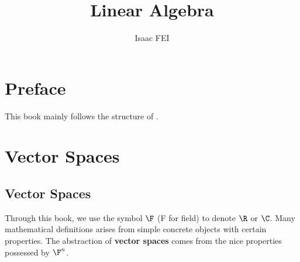 \documentclass[thmcnt=section, color=cyan, 12pt]{my-elegantbook}
\title{Linear Algebra}
\author{Isaac FEI}
\begin{document}
\maketitle


\frontmatter
\chapter*{Preface}

This book mainly follows the structure of \cite{axlerLinearAlgebraDone1997}.


\tableofcontents
\mainmatter



\chapter{Vector Spaces}



\section{Vector Spaces}

Through this book, we use the symbol $\F$ (F for field) to denote $\R$ or $\C$.
Many mathematical definitions arises from simple concrete objects
with certain properties.
The abstraction of \textbf{vector spaces}
comes from the nice properties possessed by $\F^n$.
\end{document}
